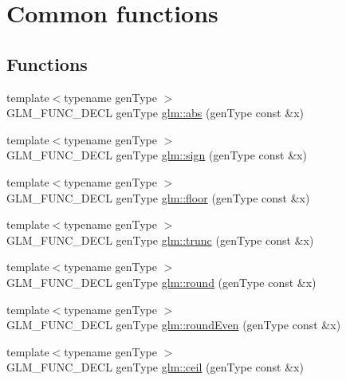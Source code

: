 \hypertarget{group__core__func__common}{}\section{Common functions}
\label{group__core__func__common}
\subsection*{Functions}
\begin{DoxyCompactItemize}
\item 
{\footnotesize template$<$typename gen\+Type $>$ }\\G\+L\+M\+\_\+\+F\+U\+N\+C\+\_\+\+D\+E\+CL gen\+Type \hyperlink{group__core__func__common_gaea946f96ec1df259802effe9f532e1c1}{glm\+::abs} (gen\+Type const \&x)
\item 
{\footnotesize template$<$typename gen\+Type $>$ }\\G\+L\+M\+\_\+\+F\+U\+N\+C\+\_\+\+D\+E\+CL gen\+Type \hyperlink{group__core__func__common_gaa7afd59ab947e313d41cb6d9c655a80c}{glm\+::sign} (gen\+Type const \&x)
\item 
{\footnotesize template$<$typename gen\+Type $>$ }\\G\+L\+M\+\_\+\+F\+U\+N\+C\+\_\+\+D\+E\+CL gen\+Type \hyperlink{group__core__func__common_ga86350252cc9bf86421317460bbd1f21c}{glm\+::floor} (gen\+Type const \&x)
\item 
{\footnotesize template$<$typename gen\+Type $>$ }\\G\+L\+M\+\_\+\+F\+U\+N\+C\+\_\+\+D\+E\+CL gen\+Type \hyperlink{group__core__func__common_gadb091aed51e45872f6dc841affa41c5c}{glm\+::trunc} (gen\+Type const \&x)
\item 
{\footnotesize template$<$typename gen\+Type $>$ }\\G\+L\+M\+\_\+\+F\+U\+N\+C\+\_\+\+D\+E\+CL gen\+Type \hyperlink{group__core__func__common_ga75ebab3fe88a9c5c769135cf5a2649ef}{glm\+::round} (gen\+Type const \&x)
\item 
{\footnotesize template$<$typename gen\+Type $>$ }\\G\+L\+M\+\_\+\+F\+U\+N\+C\+\_\+\+D\+E\+CL gen\+Type \hyperlink{group__core__func__common_ga6535952553479a4bbca7f1f12a011b17}{glm\+::round\+Even} (gen\+Type const \&x)
\item 
{\footnotesize template$<$typename gen\+Type $>$ }\\G\+L\+M\+\_\+\+F\+U\+N\+C\+\_\+\+D\+E\+CL gen\+Type \hyperlink{group__core__func__common_gab81e02fff55c9391e28fa47e68c3c903}{glm\+::ceil} (gen\+Type const \&x)

\end{DoxyCompactItemize}
